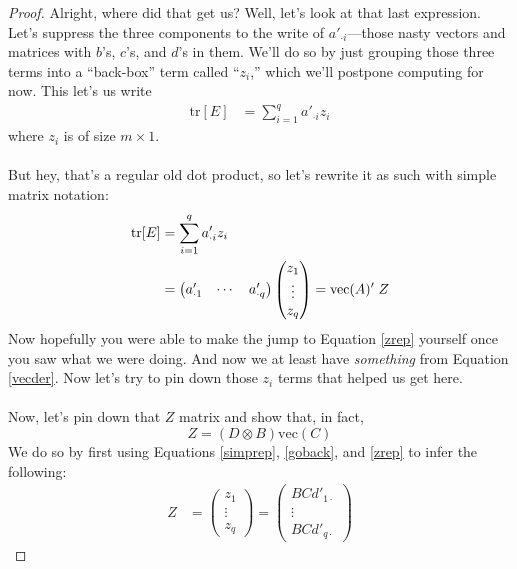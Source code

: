 \documentclass[a4paper,12pt]{scrartcl}
\begin{document}
\begin{proof}
\newpage
Alright, where did that get us? Well, let's look at 
that last expression. Let's suppress the three
components to the write of $a'_{\cdot i}$---those nasty
vectors and matrices with $b$'s, $c$'s, and $d$'s in
them. We'll do so by just grouping those three
terms into a ``back-box'' term called ``$z_i$,'' which
we'll postpone computing for now.  This let's us
write
\begin{align}
    \text{tr}[E] 
    &= \sum^q_{i=1} a'_{\cdot i}  z_i \label{goback}
\end{align}
where $z_i$ is of size $m\times 1$.
\\
\\
But hey, that's a regular old dot product, so let's
rewrite it as such with simple matrix notation:
\begin{align}
    \text{tr}[E] 
	&= \sum^q_{i=1} a'_{\cdot i}  z_i \notag \\
	&= \begin{pmatrix} a'_{\cdot 1}  
	    & \cdots & a'_{\cdot q} \end{pmatrix}
	    \begin{pmatrix} z_{1}  
	    \\ \vdots \\ z_{q} \end{pmatrix}
	= \text{vec}(A)' \; Z
    \label{zrep}
\end{align}
Now hopefully you were able to make the jump to 
Equation \ref{zrep} yourself once you saw what
we were doing.
And now we at least have \emph{something}
from Equation \ref{vecder}.
Now let's try to pin down those $z_i$ terms that
helped us get here.
\\
\\
Now, let's pin down that $Z$ matrix and show
that, in fact, 
\begin{equation}
    Z = (D\otimes B) \text{vec}(C)
\end{equation}
We do so by first using Equations 
\ref{simprep}, \ref{goback}, and \ref{zrep} to infer the
following: 
\begin{align}
    Z &= \begin{pmatrix} z_1 \\ \vdots \\ z_q 
	\end{pmatrix} = 
	\begin{pmatrix} BCd'_{1\cdot} \\ \vdots \\ BCd'_{q\cdot} 
	\end{pmatrix} \label{bigz} 
\end{align}

\end{proof}
\end{document}
